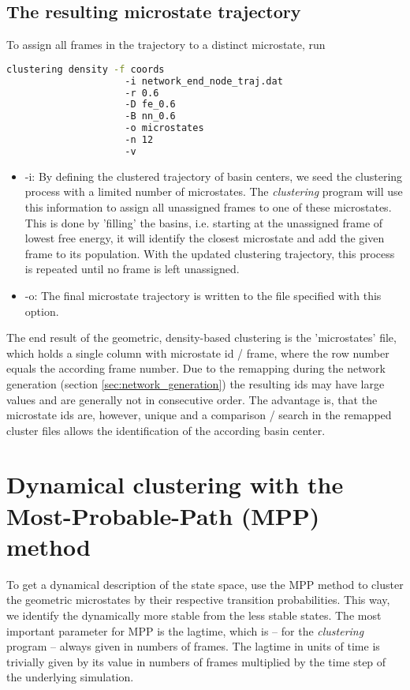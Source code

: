 \documentclass[12pt,a4paper,twoside,english,fleqn]{article}
\begin{document}
\subsection{The resulting microstate trajectory}
To assign all frames in the trajectory to a distinct microstate, run
\begin{lstlisting}[language=bash,basicstyle=\ttfamily]
  clustering density -f coords
                     -i network_end_node_traj.dat
                     -r 0.6
                     -D fe_0.6
                     -B nn_0.6
                     -o microstates
                     -n 12
                     -v
\end{lstlisting}

\begin{itemize}
  \item -i: By defining the clustered trajectory of basin centers, we seed the
            clustering process with a limited number of microstates.
            The \emph{clustering} program will use this information to assign all
            unassigned frames to one of these microstates.
            This is done by 'filling' the basins, i.e. starting at the unassigned frame of lowest
            free energy, it will identify the closest microstate and add the given frame to its population.
            With the updated clustering trajectory, this process is repeated until no frame is left unassigned.
  \item -o: The final microstate trajectory is written to the file specified with this option.
\end{itemize}

The end result of the geometric, density-based clustering is the 'microstates' file, which holds a single column with
microstate id / frame, where the row number equals the according frame number.
Due to the remapping during the network generation (section \ref{sec:network_generation}) the resulting ids may have large values
and are generally not in consecutive order.
The advantage is, that the microstate ids are, however, unique and a comparison / search in the remapped cluster files
allows the identification of the according basin center.


\section{Dynamical clustering with the Most-Probable-Path (MPP) method}
To get a dynamical description of the state space, use the MPP method to cluster the
geometric microstates by their respective transition probabilities.
This way, we identify the dynamically more stable from the less stable states.
The most important parameter for MPP is the lagtime, which is -- for the \emph{clustering} program --
always given in numbers of frames.
The lagtime in units of time is trivially given by its value in numbers of frames multiplied by
the time step of the underlying simulation.
\end{document}
